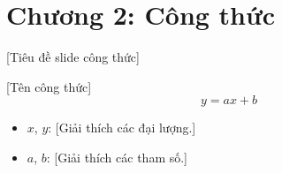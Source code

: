\section{Chương 2: Công thức}

\begin{frame}{[Tiêu đề slide công thức]}
  \begin{block}{[Tên công thức]}
    \[
      y = a x + b
    \]
  \end{block}
  \begin{itemize}
    \item $x$, $y$: [Giải thích các đại lượng.]
    \item $a$, $b$: [Giải thích các tham số.]
  \end{itemize}
\end{frame}
